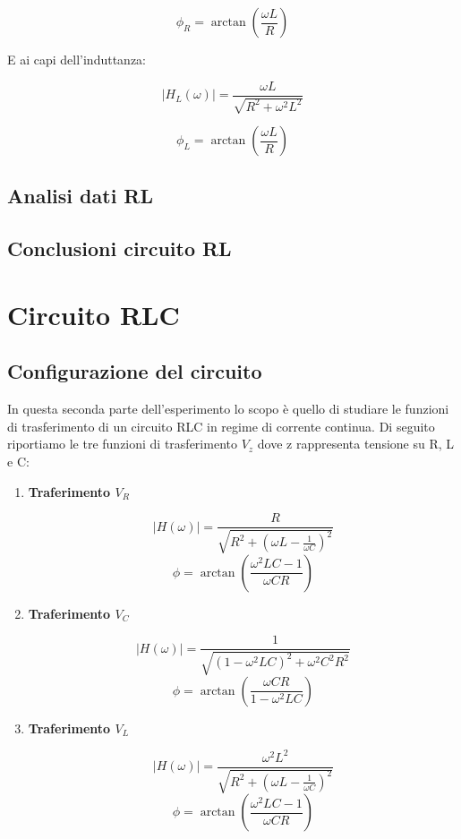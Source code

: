 \documentclass[letterpaper,12pt]{article}
\begin{document}
\begin{equation}
    \label{eq:Fase RL (resistenza)}
    \phi_R = \arctan\left(\frac{\omega L}{R}\right)
\end{equation}

E ai capi dell'induttanza:

\begin{equation}
    \label{eq:Modulo RL (induttanza)}
    |H_L(\omega)| = \frac{\omega L}{\sqrt{R^2 + \omega^2L^2}}
\end{equation}

\begin{equation}
    \label{eq:Fase RL (induttanza)}
    \phi_L = \arctan\left(\frac{\omega L}{R}\right)
\end{equation}

\subsection{Analisi dati RL}

\newpage
\subsection{Conclusioni circuito RL}



\newpage
\section{Circuito RLC}

\subsection{Configurazione del circuito}
In questa seconda parte dell'esperimento lo scopo è quello di studiare le funzioni di trasferimento di un circuito RLC in regime di corrente continua.
Di seguito riportiamo le tre funzioni di trasferimento $V_z$ dove z rappresenta tensione su R, L e C:

\begin{enumerate}
    \item \textbf{Traferimento $V_R$} 
    
    $$|H(\omega)| = \frac{R}{\sqrt{R^2 + (\omega L - \frac{1}{\omega C})^2}}$$  
    $$ \phi = \arctan(\frac{\omega^2LC -1 }{\omega CR})$$
    
     \item \textbf{Traferimento $V_C$} 
     
    $$|H(\omega)| = \frac{1}{\sqrt{(1-\omega^2LC)^2 + \omega^2C^2R^2}}$$  
    $$ \phi = \arctan(\frac{\omega CR}{1 - \omega^2 LC})$$
    
     \item \textbf{Traferimento $V_L$} 
     
    $$|H(\omega)| = \frac{\omega^2 L^2}{\sqrt{R^2 + (\omega L - \frac{1}{\omega C})^2}}$$  
    $$ \phi = \arctan(\frac{\omega^2LC -1 }{\omega CR})$$
\end{enumerate}
\end{document}
